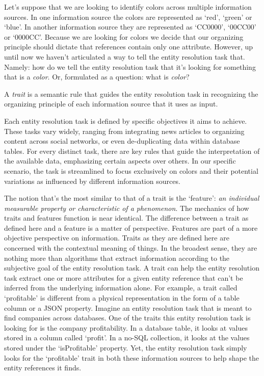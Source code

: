 \documentclass[lettersize,journal]{IEEEtran}
\begin{document}
    Let's suppose that we are looking to identify colors across multiple
    information sources.
    In one information source the colors are represented as `red', `green' or 
    `blue'.
    In another information source they are represented as `CC0000', `00CC00' or
    `0000CC'.
    Because we are looking for colors we decide that our organizing principle
    should dictate that references contain only one attribute.
    However, up until now we haven't articulated a way to tell the entity
    resolution task that.
    Namely: how do we tell the entity resolution task that it's looking for
    something that is a \textit{color}.
    Or, formulated as a question: what is \textit{color}?

    \begin{defn}
        A \textit{trait} is a semantic rule that guides the entity resolution
        task in recognizing the organizing principle of each information source
        that it uses as input.
    \end{defn}

    Each entity resolution task is defined by specific objectives it aims to
    achieve.
    These tasks vary widely, ranging from integrating news articles to
    organizing content across social networks, or even de-duplicating data
    within database tables.
    For every distinct task, there are key rules that guide the interpretation
    of the available data, emphasizing certain aspects over others.
    In our specific scenario, the task is streamlined to focus exclusively on
    colors and their potential variations as influenced by different
    information sources.
    
    The notion that's the most similar to that of a trait is the `feature':
    \textit{an individual measurable property or characteristic of a
    phenomenon}\cite{bishop2006pattern}.
    The mechanics of how traits and features function is near identical.
    The difference between a trait as defined here and a feature is a matter of
    perspective.
    Features are part of a more objective perspective on information.
    Traits as they are defined here are concerned with the contextual meaning of
    things.
    In the broadest sense, they are nothing more than algorithms that extract
    information according to the subjective goal of the entity resolution task.
    A trait can help the entity resolution task extract one or more attributes
    for a given entity reference that can't be inferred from the underlying
    information alone.
    For example, a trait called `profitable' is different from a physical
    representation in the form of a table column or a JSON property.
    Imagine an entity resolution task that is meant to find companies across
    databases.
    One of the traits this entity resolution task is looking for is the company
    profitability.
    In a database table, it looks at values stored in a column called `profit'.
    In a no-SQL collection, it looks at the values stored under the
    `isProfitable' property.
    Yet, the entity resolution task simply looks for the `profitable' trait in
    both these information sources to help shape the entity references it finds.
\end{document}
